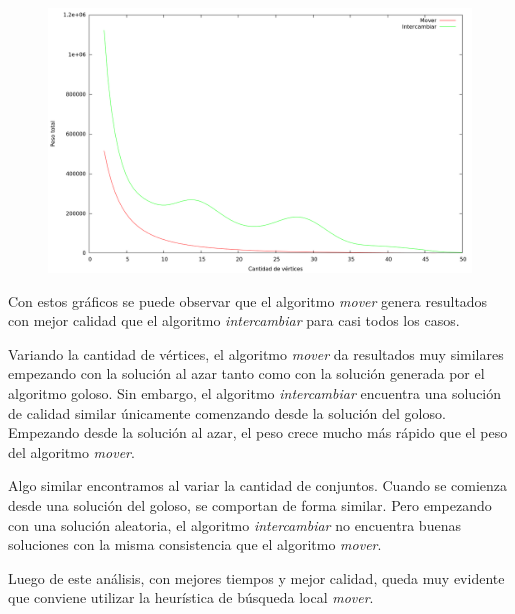 \begin{figure}[H]
  \begin{center}
    \includegraphics[scale=0.35]{imagenes/local-random-k-peso.png}
  \end{center}
\end{figure}

\vspace*{0.5cm}

Con estos gráficos se puede observar que el algoritmo \textit{mover} genera
resultados con mejor calidad que el algoritmo \textit{intercambiar} para casi
todos los casos.

Variando la cantidad de vértices, el algoritmo \textit{mover} da resultados muy
similares empezando con la solución al azar tanto como con la solución generada
por el algoritmo goloso. Sin embargo, el algoritmo \textit{intercambiar}
encuentra una solución de calidad similar únicamente comenzando desde la
solución del goloso.  Empezando desde la solución al azar, el peso crece mucho
más rápido que el peso del algoritmo \textit{mover}.

Algo similar encontramos al variar la cantidad de conjuntos. Cuando se comienza
desde una solución del goloso, se comportan de forma similar. Pero empezando
con una solución aleatoria, el algoritmo \textit{intercambiar} no encuentra
buenas soluciones con la misma consistencia que el algoritmo \textit{mover}.

Luego de este análisis, con mejores tiempos y mejor calidad, queda muy evidente
que conviene utilizar la heurística de búsqueda local \textit{mover}.
